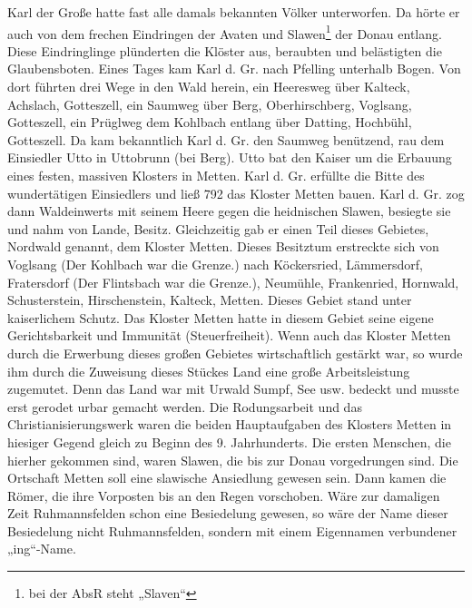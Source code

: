 \documentclass[12pt,a4paper]{book}
\begin{document}
Karl der Große hatte fast alle damals bekannten Völker unterworfen. Da
hörte er auch von dem frechen Eindringen der Avaten und
Slawen\footnote{bei der AbsR steht „Slaven“} der Donau entlang. Diese
Eindringlinge plünderten die Klöster aus, beraubten und belästigten die
Glaubensboten. Eines Tages kam Karl d. Gr. nach Pfelling unterhalb
Bogen. Von dort führten drei Wege in den Wald herein, ein Heeresweg über
Kalteck, Achslach, Gotteszell, ein Saumweg über Berg, Oberhirschberg,
Voglsang, Gotteszell, ein Prüglweg dem Kohlbach entlang über Datting,
Hochbühl, Gotteszell. Da kam bekanntlich Karl d. Gr. den Saumweg
benützend, rau dem Einsiedler Utto in Uttobrunn (bei Berg). Utto bat den
Kaiser um die Erbauung eines festen, massiven Klosters in Metten. Karl
d. Gr. erfüllte die Bitte des wundertätigen Einsiedlers und ließ 792 das
Kloster Metten bauen. Karl d. Gr. zog dann Waldeinwerts mit seinem Heere
gegen die heidnischen Slawen, besiegte sie und nahm von Lande, Besitz.
Gleichzeitig gab er einen Teil dieses Gebietes, Nordwald genannt, dem
Kloster Metten. Dieses Besitztum erstreckte sich von Voglsang (Der
Kohlbach war die Grenze.) nach Köckersried, Lämmersdorf, Fratersdorf
(Der Flintsbach war die Grenze.), Neumühle, Frankenried, Hornwald,
Schusterstein, Hirschenstein, Kalteck, Metten. Dieses Gebiet stand unter
kaiserlichem Schutz. Das Kloster Metten hatte in diesem Gebiet seine
eigene Gerichtsbarkeit und Immunität (Steuerfreiheit). Wenn auch das
Kloster Metten durch die Erwerbung dieses großen Gebietes wirtschaftlich
gestärkt war, so wurde ihm durch die Zuweisung dieses Stückes Land eine
große Arbeitsleistung zugemutet. Denn das Land war mit Urwald Sumpf, See
usw. bedeckt und musste erst gerodet urbar gemacht werden. Die
Rodungsarbeit und das Christianisierungswerk waren die beiden
Hauptaufgaben des Klosters Metten in hiesiger Gegend gleich zu Beginn
des 9. Jahrhunderts. Die ersten Menschen, die hierher gekommen sind,
waren Slawen, die bis zur Donau vorgedrungen sind. Die Ortschaft Metten
soll eine slawische Ansiedlung gewesen sein. Dann kamen die Römer, die
ihre Vorposten bis an den Regen vorschoben. Wäre zur damaligen Zeit
Ruhmannsfelden schon eine Besiedelung gewesen, so wäre der Name dieser
Besiedelung nicht Ruhmannsfelden, sondern mit einem Eigennamen
verbundener „ing“-Name.
\end{document}
